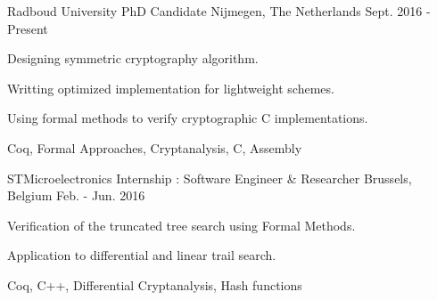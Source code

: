 

\begin{cventries}

  \cventrysix%
    {Radboud University} %
    {PhD Candidate} %
    {Nijmegen, The Netherlands} %
    {Sept. 2016 - Present} %
    {
      \begin{cvitems} %
        \item {Designing symmetric cryptography algorithm.} %
        \item {Writting optimized implementation for lightweight schemes.} %
        \item {Using formal methods to verify cryptographic C implementations.} %
      \end{cvitems}
    }%
    {Coq, Formal Approaches, Cryptanalysis, C, Assembly}%

%

  \cventrysix%
    {STMicroelectronics} %
    {Internship : Software Engineer \& Researcher} %
    {Brussels, Belgium} %
    {Feb. - Jun. 2016} %
    {
      \begin{cvitems} %
        \item {Verification of the truncated tree search using Formal Methods.} %
        \item {Application to differential and linear trail search.} %
      \end{cvitems}
    }%
    {Coq, C++, Differential Cryptanalysis, Hash functions}%


\end{cventries}
